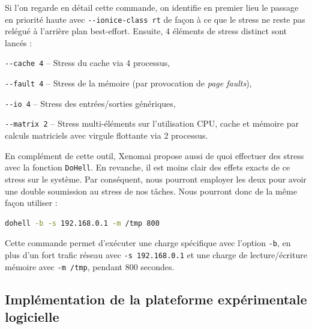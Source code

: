 \documentclass[french, a4paper, 11pt, twoside, pdftex]{StyleThese}
\begin{document}
	Si l'on regarde en détail cette commande, on identifie en premier lieu le passage en priorité haute avec \texttt{-{}-ionice-class rt} de façon à ce que le stress ne reste pas relégué à l'arrière plan best-effort. Ensuite, 4 éléments de stress distinct sont lancés : 
	\begin{description}
		\item \texttt{-{}-cache 4} -- Stress du cache via 4 processus,
		\item \texttt{-{}-fault 4} -- Stress de la mémoire (par provocation de \textit{page faults}),
		\item \texttt{-{}-io 4} -- Stress des entrées/sorties génériques,
		\item \texttt{-{}-matrix 2} -- Stress multi-éléments sur l'utilisation CPU, cache et mémoire par calculs matriciels avec virgule flottante via 2 processus.
	\end{description}

	En complément de cette outil, Xenomai propose aussi de quoi effectuer des stress avec la fonction \texttt{DoHell}. En revanche, il est moins clair des effets exacts de ce stress sur le système. Par conséquent, nous pourront employer les deux pour avoir une double soumission au stress de nos tâches. Nous pourront donc de la même façon utiliser : 

	\begin{lstlisting}[language=bash, numbers=none]
	dohell -b -s 192.168.0.1 -m /tmp 800\end{lstlisting}
	
	
	Cette commande permet d'exécuter une charge spécifique avec l'option \texttt{-b}, en plus d'un fort trafic réseau avec \texttt{-s 192.168.0.1} et une charge de lecture/écriture mémoire avec \texttt{-m /tmp}, pendant 800 secondes.
        
    \subsection{Implémentation de la plateforme expérimentale logicielle}
    
\end{document}
